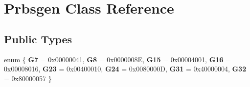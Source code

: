 \hypertarget{class_prbsgen}{}\section{Prbsgen Class Reference}
\label{class_prbsgen}
\subsection*{Public Types}
\begin{DoxyCompactItemize}
\item 
\mbox{\label{class_prbsgen_aed8e522b9e223cb2eb7cc30af15d0a56}} 
enum \{ \newline
{\bfseries G7} = 0x00000041, 
{\bfseries G8} = 0x0000008E, 
{\bfseries G15} = 0x00004001, 
{\bfseries G16} = 0x00008016, 
\newline
{\bfseries G23} = 0x00400010, 
{\bfseries G24} = 0x0080000D, 
{\bfseries G31} = 0x40000004, 
{\bfseries G32} = 0x80000057
 \}
\end{DoxyCompactItemize}
